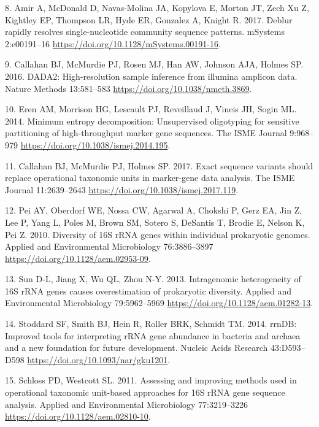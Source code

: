\documentclass[
]{article}
\newenvironment{cslreferences}%
  {}%
  {\par}
\begin{document}
\begin{cslreferences}
\leavevmode\hypertarget{ref-Amir2017}{}%
8. Amir A, McDonald D, Navas-Molina JA, Kopylova E, Morton JT, Zech Xu
Z, Kightley EP, Thompson LR, Hyde ER, Gonzalez A, Knight R. 2017. Deblur
rapidly resolves single-nucleotide community sequence patterns. mSystems
2:e00191--16 \url{https://doi.org/10.1128/mSystems.00191-16}.

\leavevmode\hypertarget{ref-Callahan2016}{}%
9. Callahan BJ, McMurdie PJ, Rosen MJ, Han AW, Johnson AJA, Holmes SP.
2016. DADA2: High-resolution sample inference from illumina amplicon
data. Nature Methods 13:581--583
\url{https://doi.org/10.1038/nmeth.3869}.

\leavevmode\hypertarget{ref-Eren2014}{}%
10. Eren AM, Morrison HG, Lescault PJ, Reveillaud J, Vineis JH, Sogin
ML. 2014. Minimum entropy decomposition: Unsupervised oligotyping for
sensitive partitioning of high-throughput marker gene sequences. The
ISME Journal 9:968--979 \url{https://doi.org/10.1038/ismej.2014.195}.

\leavevmode\hypertarget{ref-Callahan2017}{}%
11. Callahan BJ, McMurdie PJ, Holmes SP. 2017. Exact sequence variants
should replace operational taxonomic units in marker-gene data analysis.
The ISME Journal 11:2639--2643
\url{https://doi.org/10.1038/ismej.2017.119}.

\leavevmode\hypertarget{ref-Pei2010}{}%
12. Pei AY, Oberdorf WE, Nossa CW, Agarwal A, Chokshi P, Gerz EA, Jin Z,
Lee P, Yang L, Poles M, Brown SM, Sotero S, DeSantis T, Brodie E, Nelson
K, Pei Z. 2010. Diversity of 16S rRNA genes within individual
prokaryotic genomes. Applied and Environmental Microbiology
76:3886--3897 \url{https://doi.org/10.1128/aem.02953-09}.

\leavevmode\hypertarget{ref-Sun2013}{}%
13. Sun D-L, Jiang X, Wu QL, Zhou N-Y. 2013. Intragenomic heterogeneity
of 16S rRNA genes causes overestimation of prokaryotic diversity.
Applied and Environmental Microbiology 79:5962--5969
\url{https://doi.org/10.1128/aem.01282-13}.

\leavevmode\hypertarget{ref-Stoddard2014}{}%
14. Stoddard SF, Smith BJ, Hein R, Roller BRK, Schmidt TM. 2014. rrnDB:
Improved tools for interpreting rRNA gene abundance in bacteria and
archaea and a new foundation for future development. Nucleic Acids
Research 43:D593--D598 \url{https://doi.org/10.1093/nar/gku1201}.

\leavevmode\hypertarget{ref-Schloss2011}{}%
15. Schloss PD, Westcott SL. 2011. Assessing and improving methods used
in operational taxonomic unit-based approaches for 16S rRNA gene
sequence analysis. Applied and Environmental Microbiology 77:3219--3226
\url{https://doi.org/10.1128/aem.02810-10}.


\end{cslreferences}
\end{document}

